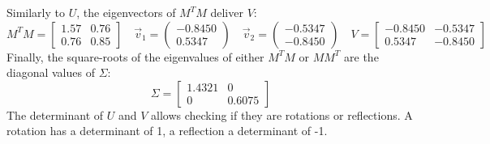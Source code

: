 Similarly to $U$, the eigenvectors of $M^{T}M$ deliver $V$:
\begin{equation*}
    M^{T}M= 
    \begin{bmatrix}
        1.57 & 0.76  \\
        0.76 & 0.85
    \end{bmatrix}  \quad
    \vec{v}_{1} =
    \begin{pmatrix}
        -0.8450 \\
        0.5347
    \end{pmatrix}\quad
    \vec{v}_{2} =
    \begin{pmatrix}
        -0.5347 \\
        -0.8450
    \end{pmatrix}\quad
    V= 
    \begin{bmatrix}
        -0.8450 & -0.5347  \\
        0.5347 & -0.8450
    \end{bmatrix}
\end{equation*}
Finally, the square-roots of the eigenvalues of either $M^{T}M$ or $MM^{T}$ are the diagonal values of $\Sigma$:
\begin{equation*}
    \Sigma= 
    \begin{bmatrix}
        1.4321 & 0  \\
        0 & 0.6075
    \end{bmatrix}
\end{equation*}
The determinant of $U$ and $V$ allows checking if they are rotations or reflections. A rotation has a determinant of 1, a reflection a determinant of -1.
